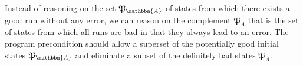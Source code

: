 \documentclass[envcountsame]{llncs}
\makeatletter
\newif\iflong\longfalse%
\renewcommand{\vec}[1]{\@ifnextchar'{\@vec{#1}\mskip3mu}{\@vec{#1}\mskip1.5mu}}
\def\p@vec#1{\rlap{$\acute{\phantom{#1}}$}\@vec{#1}}
\newcommand{\pvec}[1]{\@ifnextchar'{\p@vec{#1}\mskip3mu}{\p@vec{#1}\mskip1.5mu}}
\newcommand{\implies}{\ensuremath{\Rightarrow}}
\renewcommand{\iff}{\ensuremath{\Leftrightarrow}}
\makeatother
\begin{document}
\fi
\iflong
\begin{corollary}
The condition $s\in \mathfrak{P}_{\mathbbm{A}}$ is sufficient for the absence of errors in at least one run from $s$$\,$\footnote{$P$ is \emph{necessary} for $Q$ if and only if $Q\implies P$ (so if $P$ does not hold then $Q$ cannot hold)).}. So $s\not\in\mathfrak{P}_{\mathbbm{A}}$ is a necessary condition for the presence of an error along all runs from $s$$\,$\footnote{$P$ is \emph{sufficient} for $Q$ if and only if $P\implies Q$.}.
\end{corollary}
\begin{proof}\hfill~
\begin{calculus}[$\iff$\ ]
\formula{s\in \mathfrak{P}_{\mathbbm{A}}}\\
$\implies$\formulaexplanation{\exists s\vec{s}\in\vec{\tau}^+\cap\neg\pvec{\mathfrak{E}}_{\mathbbm{A}}}{def.\ $\mathfrak{P}_{\mathbbm{A}}$}\\
$\implies$\formulaexplanation{\exists \vec{s}:s\vec{s}\in\vec{\tau}^+\wedge s\vec{s}\not\in\pvec{\mathfrak{E}}_{\mathbbm{A}}}{def.\ $\cap$ and $\neg$}\\
$\implies$\formulaexplanation{\neg(\forall \vec{s}:s\vec{s}\not\in\vec{\tau}^+\vee s\vec{s}\in\pvec{\mathfrak{E}}_{\mathbbm{A}})}{def.\ $\neg$}\\
$\implies$\formulaexplanation{\neg(\forall \vec{s}:(s\vec{s}\in\vec{\tau}^+)\implies( s\vec{s}\in\pvec{\mathfrak{E}}_{\mathbbm{A}}))}{def.\ $\implies $}
\end{calculus}
and so $\forall s:(\forall s\vec{s}\in\vec{\tau}^+:s\vec{s}\in\pvec{\mathfrak{E}}_{\mathbbm{A}}) \implies(s\not\in \mathfrak{P}_{\mathbbm{A}})$. 
\qed\end{proof}
\fi
Instead of reasoning on the set $\mathfrak{P}_{\mathbbm{A}} $ of states from which there exists a good run without any error, we can reason on the complement $\overline{\mathfrak{P}}_A$ that is the set of states from which all runs are bad in that they always lead to an error.
\iflong  The program precondition should allow a superset of the potentially good initial states $ \mathfrak{P}_{\mathbbm{A}} $ and eliminate a subset of the definitely bad states $\overline{\mathfrak{P}}_A$.
\end{document}

